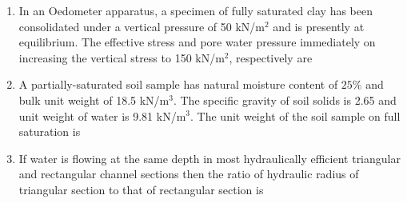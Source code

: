 \documentclass[journal,12pt,onecolumn]{article}
\theoremstyle{remark}
\begin{document}
\begin{enumerate}
\hfill{}
\begin{enumerate}
\end{enumerate}

\item In an Oedometer apparatus, a specimen of fully saturated clay has been consolidated under a vertical pressure of 50 kN/m$^2$ and is presently at equilibrium. The effective stress and pore water pressure immediately on increasing the vertical stress to 150 kN/m$^2$, respectively are

\hfill{}
\begin{enumerate}
\end{enumerate}

\item A partially-saturated soil sample has natural moisture content of $25\%$ and bulk unit weight of 18.5 kN/m$^3$. The specific gravity of soil solids is 2.65 and unit weight of water is 9.81 kN/m$^3$. The unit weight of the soil sample on full saturation is

\hfill{}
\begin{enumerate}
\end{enumerate}

\item If water is flowing at the same depth in most hydraulically efficient triangular and rectangular channel sections then the ratio of hydraulic radius of triangular section to that of rectangular section is


\end{enumerate}
\end{document}

